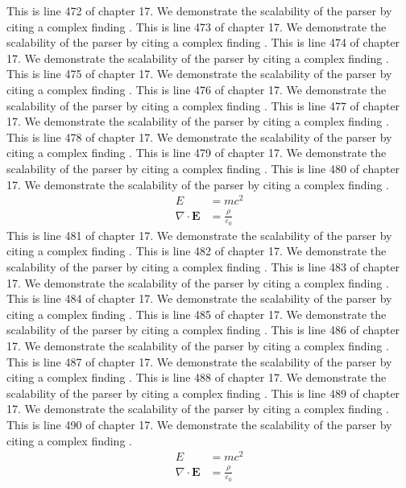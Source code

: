 This is line 472 of chapter 17. We demonstrate the scalability of the parser by citing a complex finding \cite{ref17_472}.
This is line 473 of chapter 17. We demonstrate the scalability of the parser by citing a complex finding \cite{ref17_473}.
This is line 474 of chapter 17. We demonstrate the scalability of the parser by citing a complex finding \cite{ref17_474}.
This is line 475 of chapter 17. We demonstrate the scalability of the parser by citing a complex finding \cite{ref17_475}.
This is line 476 of chapter 17. We demonstrate the scalability of the parser by citing a complex finding \cite{ref17_476}.
This is line 477 of chapter 17. We demonstrate the scalability of the parser by citing a complex finding \cite{ref17_477}.
This is line 478 of chapter 17. We demonstrate the scalability of the parser by citing a complex finding \cite{ref17_478}.
This is line 479 of chapter 17. We demonstrate the scalability of the parser by citing a complex finding \cite{ref17_479}.
This is line 480 of chapter 17. We demonstrate the scalability of the parser by citing a complex finding \cite{ref17_480}.
\begin{align*}
  E &= mc^2 \\
  \nabla \cdot \mathbf{E} &= \frac{\rho}{\varepsilon_0}
\end{align*}
This is line 481 of chapter 17. We demonstrate the scalability of the parser by citing a complex finding \cite{ref17_481}.
This is line 482 of chapter 17. We demonstrate the scalability of the parser by citing a complex finding \cite{ref17_482}.
This is line 483 of chapter 17. We demonstrate the scalability of the parser by citing a complex finding \cite{ref17_483}.
This is line 484 of chapter 17. We demonstrate the scalability of the parser by citing a complex finding \cite{ref17_484}.
This is line 485 of chapter 17. We demonstrate the scalability of the parser by citing a complex finding \cite{ref17_485}.
This is line 486 of chapter 17. We demonstrate the scalability of the parser by citing a complex finding \cite{ref17_486}.
This is line 487 of chapter 17. We demonstrate the scalability of the parser by citing a complex finding \cite{ref17_487}.
This is line 488 of chapter 17. We demonstrate the scalability of the parser by citing a complex finding \cite{ref17_488}.
This is line 489 of chapter 17. We demonstrate the scalability of the parser by citing a complex finding \cite{ref17_489}.
This is line 490 of chapter 17. We demonstrate the scalability of the parser by citing a complex finding \cite{ref17_490}.
\begin{align*}
  E &= mc^2 \\
  \nabla \cdot \mathbf{E} &= \frac{\rho}{\varepsilon_0}
\end{align*}
